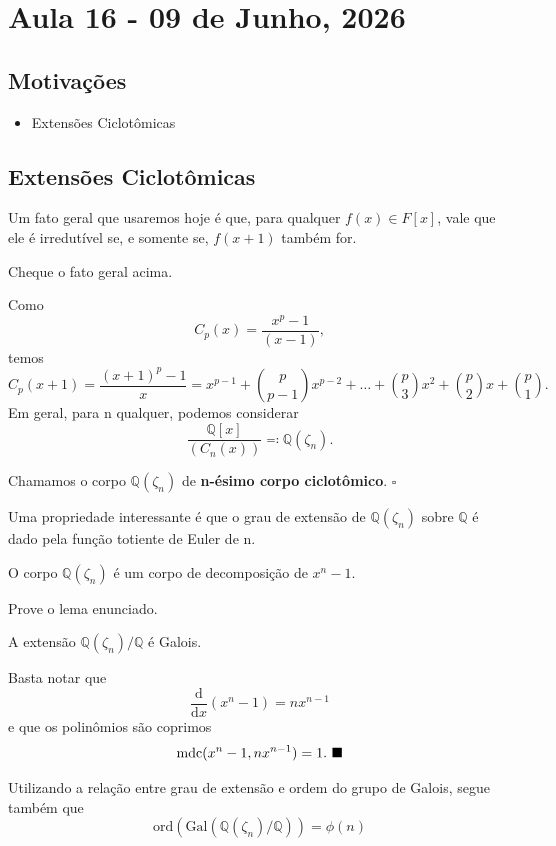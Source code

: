 \documentclass[../algebraIII_notes.tex]{subfiles}
\begin{document}
\section{Aula 16 - 09 de Junho, 2026}
\subsection{Motivações}
\begin{itemize}
	\item Extensões Ciclotômicas
\end{itemize}
\subsection{Extensões Ciclotômicas}
Um fato geral que usaremos hoje é que, para qualquer \(f(x)\in F[x]\), vale que ele é irredutível se, e somente se, \(f(x+1)\) também for.
\begin{exr}
	Cheque o fato geral acima.
\end{exr}
Como
\[
	C_{p}(x) = \frac{x^{p}-1}{(x-1)},
\]
temos
\[
	C_{p}(x+1) = \frac{(x+1)^{p}-1}{x} = x^{p-1} + \binom{p}{p-1}x^{p-2}+\dotsc +\binom{p}{3}x^{2}+\binom{p}{2}x + \binom{p}{1}.
\]
Em geral, para n qualquer, podemos considerar
\[
	\frac{\mathbb{Q}[x]}{(C_{n}(x))} \eqqcolon \mathbb{Q}(\zeta_{n}).
\]
\begin{def*}
	Chamamos o corpo \(\mathbb{Q}(\zeta_{n})\) de \textbf{n-ésimo corpo ciclotômico}. \(\square\)
\end{def*}
Uma propriedade interessante é que o grau de extensão de \(\mathbb{Q}(\zeta_{n})\) sobre \(\mathbb{Q}\) é dado pela função totiente de Euler de n.
\begin{lemma*}
	O corpo \(\mathbb{Q}(\zeta_{n})\) é um corpo de decomposição de \(x^{n}-1\).
\end{lemma*}
\begin{exr}
	Prove o lema enunciado.
\end{exr}
\begin{crl*}
	A extensão \(\mathbb{Q}(\zeta_{n})/\mathbb{Q}\) é Galois.
\end{crl*}
\begin{proof*}
	Basta notar que
	\[
		\frac{\mathrm{d}}{\mathrm{d}x}(x^{n}-1) = nx^{n-1}
	\]
	e que os polinômios são coprimos
	\[
		\mathrm{mdc}(x^{n}-1, nx^{n-1})=1. \text{ $\blacksquare$}
	\]
\end{proof*}
Utilizando a relação entre grau de extensão e ordem do grupo de Galois, segue também que
\[
	\mathrm{ord}(\mathrm{Gal}(\mathbb{Q}(\zeta_{n})/\mathbb{Q})) = \phi(n)
\]
\end{document}
